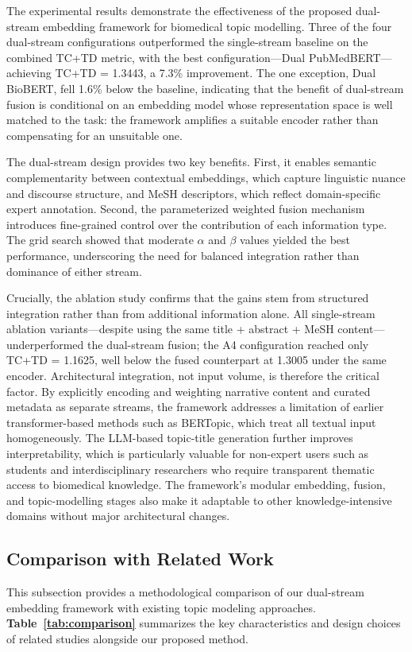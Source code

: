 \documentclass[authorproof,JACIII,researchpaper]{fujipressarticle}
\begin{document}
The experimental results demonstrate the effectiveness of the proposed dual-stream embedding framework for biomedical topic modelling. Three of the four dual-stream configurations outperformed the single-stream baseline on the combined TC+TD metric, with the best configuration---Dual PubMedBERT---achieving TC+TD = 1.3443, a 7.3\% improvement. The one exception, Dual BioBERT, fell 1.6\% below the baseline, indicating that the benefit of dual-stream fusion is conditional on an embedding model whose representation space is well matched to the task: the framework amplifies a suitable encoder rather than compensating for an unsuitable one.

The dual-stream design provides two key benefits. First, it enables semantic complementarity between contextual embeddings, which capture linguistic nuance and discourse structure, and MeSH descriptors, which reflect domain-specific expert annotation. Second, the parameterized weighted fusion mechanism introduces fine-grained control over the contribution of each information type. The grid search showed that moderate $\alpha$ and $\beta$ values yielded the best performance, underscoring the need for balanced integration rather than dominance of either stream.

Crucially, the ablation study confirms that the gains stem from structured integration rather than from additional information alone. All single-stream ablation variants---despite using the same title + abstract + MeSH content---underperformed the dual-stream fusion; the A4 configuration reached only TC+TD = 1.1625, well below the fused counterpart at 1.3005 under the same encoder. Architectural integration, not input volume, is therefore the critical factor. By explicitly encoding and weighting narrative content and curated metadata as separate streams, the framework addresses a limitation of earlier transformer-based methods such as BERTopic, which treat all textual input homogeneously. The LLM-based topic-title generation further improves interpretability, which is particularly valuable for non-expert users such as students and interdisciplinary researchers who require transparent thematic access to biomedical knowledge. The framework's modular embedding, fusion, and topic-modelling stages also make it adaptable to other knowledge-intensive domains without major architectural changes.

\subsection{Comparison with Related Work}
This subsection provides a methodological comparison of our dual-stream embedding framework with existing topic modeling approaches. \textbf{Table~\ref{tab:comparison}} summarizes the key characteristics and design choices of related studies alongside our proposed method.
\end{document}
